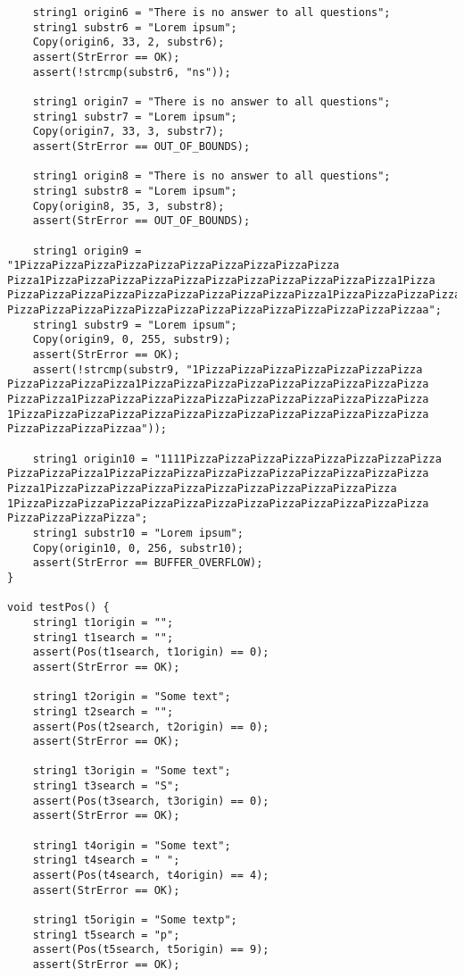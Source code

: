 \documentclass[a4paper,14pt]{extarticle}
\begin{document}
\begin{enumerate}
\begin{verbatim}
    string1 origin6 = "There is no answer to all questions";
    string1 substr6 = "Lorem ipsum";
    Copy(origin6, 33, 2, substr6);
    assert(StrError == OK);
    assert(!strcmp(substr6, "ns"));

    string1 origin7 = "There is no answer to all questions";
    string1 substr7 = "Lorem ipsum";
    Copy(origin7, 33, 3, substr7);
    assert(StrError == OUT_OF_BOUNDS);

    string1 origin8 = "There is no answer to all questions";
    string1 substr8 = "Lorem ipsum";
    Copy(origin8, 35, 3, substr8);
    assert(StrError == OUT_OF_BOUNDS);

    string1 origin9 = "1PizzaPizzaPizzaPizzaPizzaPizzaPizzaPizzaPizzaPizza
Pizza1PizzaPizzaPizzaPizzaPizzaPizzaPizzaPizzaPizzaPizzaPizza1Pizza
PizzaPizzaPizzaPizzaPizzaPizzaPizzaPizzaPizzaPizza1PizzaPizzaPizzaPizza
PizzaPizzaPizzaPizzaPizzaPizzaPizzaPizzaPizzaPizzaPizzaPizzaPizzaa";
    string1 substr9 = "Lorem ipsum";
    Copy(origin9, 0, 255, substr9);
    assert(StrError == OK);
    assert(!strcmp(substr9, "1PizzaPizzaPizzaPizzaPizzaPizzaPizza
PizzaPizzaPizzaPizza1PizzaPizzaPizzaPizzaPizzaPizzaPizzaPizzaPizza
PizzaPizza1PizzaPizzaPizzaPizzaPizzaPizzaPizzaPizzaPizzaPizzaPizza
1PizzaPizzaPizzaPizzaPizzaPizzaPizzaPizzaPizzaPizzaPizzaPizzaPizza
PizzaPizzaPizzaPizzaa"));
    
    string1 origin10 = "1111PizzaPizzaPizzaPizzaPizzaPizzaPizzaPizza
PizzaPizzaPizza1PizzaPizzaPizzaPizzaPizzaPizzaPizzaPizzaPizzaPizza
Pizza1PizzaPizzaPizzaPizzaPizzaPizzaPizzaPizzaPizzaPizzaPizza
1PizzaPizzaPizzaPizzaPizzaPizzaPizzaPizzaPizzaPizzaPizzaPizzaPizza
PizzaPizzaPizzaPizza";
    string1 substr10 = "Lorem ipsum";
    Copy(origin10, 0, 256, substr10);
    assert(StrError == BUFFER_OVERFLOW);
}

void testPos() {
    string1 t1origin = "";
    string1 t1search = "";
    assert(Pos(t1search, t1origin) == 0);
    assert(StrError == OK);

    string1 t2origin = "Some text";
    string1 t2search = "";
    assert(Pos(t2search, t2origin) == 0);
    assert(StrError == OK);

    string1 t3origin = "Some text";
    string1 t3search = "S";
    assert(Pos(t3search, t3origin) == 0);
    assert(StrError == OK);

    string1 t4origin = "Some text";
    string1 t4search = " ";
    assert(Pos(t4search, t4origin) == 4);
    assert(StrError == OK);

    string1 t5origin = "Some textp";
    string1 t5search = "p";
    assert(Pos(t5search, t5origin) == 9);
    assert(StrError == OK);


\end{verbatim}
\end{enumerate}
\end{document}
